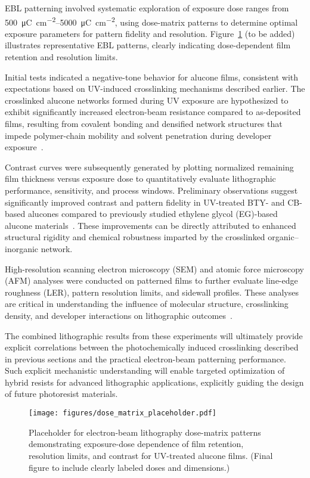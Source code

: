 EBL patterning involved systematic exploration of exposure dose ranges from \SIrange{500}{5000}{\micro\coulomb\per\centi\meter\squared}, using dose-matrix patterns to determine optimal exposure parameters for pattern fidelity and resolution. Figure~\ref{fig:dose_matrix} (to be added) illustrates representative EBL patterns, clearly indicating dose-dependent film retention and resolution limits.

Initial tests indicated a negative-tone behavior for alucone films, consistent with expectations based on UV-induced crosslinking mechanisms described earlier. The crosslinked alucone networks formed during UV exposure are hypothesized to exhibit significantly increased electron-beam resistance compared to as-deposited films, resulting from covalent bonding and densified network structures that impede polymer-chain mobility and solvent penetration during developer exposure~\cite{REF}.

Contrast curves were subsequently generated by plotting normalized remaining film thickness versus exposure dose to quantitatively evaluate lithographic performance, sensitivity, and process windows. Preliminary observations suggest significantly improved contrast and pattern fidelity in UV-treated BTY- and CB-based alucones compared to previously studied ethylene glycol (EG)-based alucone materials~\cite{REF}. These improvements can be directly attributed to enhanced structural rigidity and chemical robustness imparted by the crosslinked organic–inorganic network.

High-resolution scanning electron microscopy (SEM) and atomic force microscopy (AFM) analyses were conducted on patterned films to further evaluate line-edge roughness (LER), pattern resolution limits, and sidewall profiles. These analyses are critical in understanding the influence of molecular structure, crosslinking density, and developer interactions on lithographic outcomes~\cite{REF}.


The combined lithographic results from these experiments will ultimately provide explicit correlations between the photochemically induced crosslinking described in previous sections and the practical electron-beam patterning performance. Such explicit mechanistic understanding will enable targeted optimization of hybrid resists for advanced lithographic applications, explicitly guiding the design of future photoresist materials.

\begin{figure}[ht]
  \centering
  \texttt{[image: figures/dose\_matrix\_placeholder.pdf]}
  \caption{Placeholder for electron-beam lithography dose-matrix patterns demonstrating exposure-dose dependence of film retention, resolution limits, and contrast for UV-treated alucone films. (Final figure to include clearly labeled doses and dimensions.)}
  \label{fig:dose_matrix}
\end{figure}
